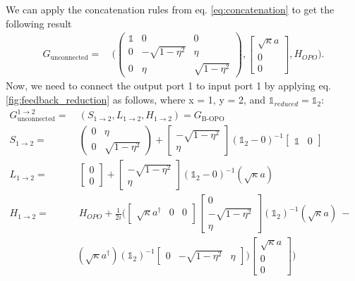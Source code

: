 \documentclass[a4paper]{article}
\theoremstyle{definition}
\begin{document}
We can apply the concatenation rules from eq. \ref{eq:concatenation} to get the following result
\begin{align*}
     G_{\text{unconnected}} = & \ \Bigg( \begin{pmatrix} \mathbb{1} & 0 & 0 \\ 0 & -\sqrt{1-\eta^2} & \eta \\ 0 & \eta & \sqrt{1-\eta^2}  \end{pmatrix},\begin{bmatrix} \sqrt{\kappa}a \\ 0 \\ 0 \end{bmatrix}, H_{OPO} \Bigg).
\end{align*}
Now, we need to connect the output port 1 to input port 1 by applying eq. \ref{fig:feedback_reduction} as follows, where x = 1, y = 2, and $\mathbb{1}_{reduced} = \mathbb{1}_2$: 
\begin{align*}
    G_{\text{unconnected}}^{1 \rightarrow 2} = & \ (S_{1 \rightarrow 2}, L_{1 \rightarrow 2}, H_{1 \rightarrow 2}) =  G_{\text{B-OPO}} &  \\
    S_{1 \rightarrow 2} = & \ \begin{pmatrix}  0 & \eta \\ 0 & \sqrt{1-\eta^2}  \end{pmatrix} + \begin{bmatrix}  -\sqrt{1-\eta^2} \\ \eta \end{bmatrix} (\mathbb{1}_2-0)^{-1} \begin{bmatrix} \mathbb{1}  & 0 \end{bmatrix} & \\
    L_{1 \rightarrow 2} = & \ \begin{bmatrix}  0 \\ 0 \end{bmatrix} + \begin{bmatrix}  -\sqrt{1-\eta^2} \\ \eta \end{bmatrix} (\mathbb{1}_2-0)^{-1}(\sqrt{\kappa}a) & \\
    H_{1 \rightarrow 2} = & \ H_{OPO} + \frac{1}{2i}\Bigg( \begin{bmatrix} \sqrt{\kappa}a^\dagger  & 0 & 0 \end{bmatrix} \begin{bmatrix} 0   \\  -\sqrt{1-\eta^2} \\ \eta \end{bmatrix}  (\mathbb{1}_2)^{-1}(\sqrt{\kappa}a) \ - &  
    \\ &  (\sqrt{\kappa}a^\dagger) (\mathbb{1}_2)^{-1} \begin{bmatrix} 0  &  - \sqrt{1-\eta^2} & \eta \end{bmatrix} ) \begin{bmatrix} \sqrt{\kappa}a \\ 0 \\ 0 \end{bmatrix} \Bigg)
\end{align*}
\end{document}

